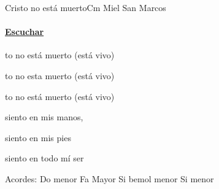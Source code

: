 \documentclass[12pt, spanish]{book}
\newcommand{\NotCCLIed}{\relax}
\begin{document}
    \begin{song}{Cristo no está muerto}{Cm}
    {} %
    {Miel San Marcos}
    {} %
    {} %
        \ifChordBk
        \paragraph{\mbox{}\hfill\protect\href{https://open.spotify.com/intl-es/track/6bDHJjWEiWux7haSU8r4g5}{Escuchar}\mbox{}\hfill}
        \fi


        \begin{SBChorus}
            to no está muerto (está vivo)

            to no esta muerto (está vivo)

            to no está muerto (está vivo)
        \end{SBChorus}

        \begin{SBOpGroup}
             siento en mis manos,

             siento en mis pies

             siento en todo mí ser
        \end{SBOpGroup}

        \ifChordBk
        \begin{SBOpGroup}
            Acordes:\break
            \upchord{\Cm}\qquad Do menor \hfill
            \upchord{\F}\qquad Fa Mayor \hfill\null\break
            \upchord{\Bflatm}Si bemol menor \hfill
            \upchord{\Bm}\qquad Si menor \hfill\null\break
        \end{SBOpGroup}
        \fi
    \end{song}
\end{document}
